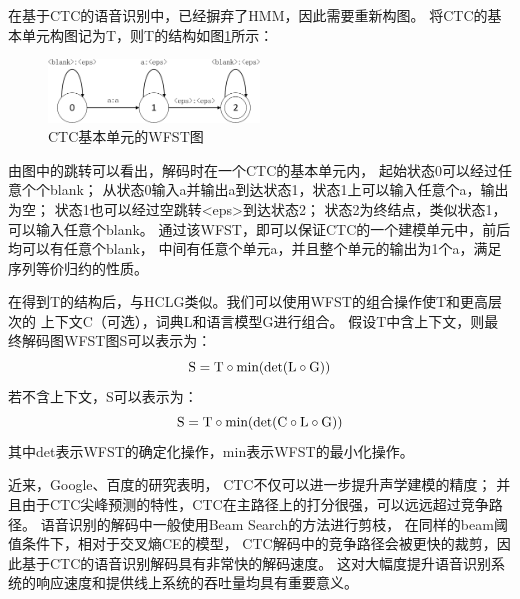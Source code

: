 在基于CTC的语音识别中，已经摒弃了HMM，因此需要重新构图。
将CTC的基本单元构图记为T，则T的结构如图\ref{fig:t}所示：
\begin{figure}[htbp]
\centering
\includegraphics[width=0.5\textwidth]{figures/chapter4/t-crop}
\caption{CTC基本单元的WFST图}
\label{fig:t}
\end{figure}
由图中的跳转可以看出，解码时在一个CTC的基本单元内，
起始状态0可以经过任意个个blank；
从状态0输入a并输出a到达状态1，状态1上可以输入任意个a，输出为空；
状态1也可以经过空跳转<eps>到达状态2；
状态2为终结点，类似状态1，可以输入任意个blank。
通过该WFST，即可以保证CTC的一个建模单元中，前后均可以有任意个blank，
中间有任意个单元a，并且整个单元的输出为1个a，满足序列等价归约的性质。

在得到T的结构后，与HCLG类似。我们可以使用WFST的组合操作使T和更高层次的
上下文C（可选），词典L和语言模型G进行组合。
假设T中含上下文，则最终解码图WFST图S可以表示为：
\begin{equation}
{\rm{S = T}} \circ {\rm{min(det(L}} \circ {\rm{G))}}
\end{equation}
若不含上下文，S可以表示为：
\begin{equation}
{\rm{S = T}} \circ {\rm{min(det(C}} \circ {\rm{L}} \circ {\rm{G))}}
\end{equation}
其中det表示WFST的确定化操作，min表示WFST的最小化操作。

近来，Google、百度的研究表明，
CTC不仅可以进一步提升声学建模的精度；
并且由于CTC尖峰预测的特性，CTC在主路径上的打分很强，可以远远超过竞争路径。
语音识别的解码中一般使用Beam Search的方法进行剪枝，
在同样的beam阈值条件下，相对于交叉熵CE的模型，
CTC解码中的竞争路径会被更快的裁剪，因此基于CTC的语音识别解码具有非常快的解码速度。
这对大幅度提升语音识别系统的响应速度和提供线上系统的吞吐量均具有重要意义。 